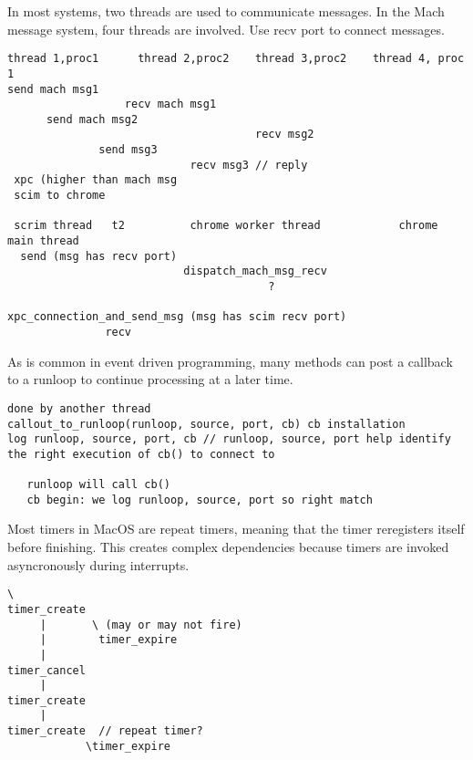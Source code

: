 In most systems, two threads are used to communicate messages.
In the Mach message system, four threads are involved.
Use recv port to connect messages.

{\footnotesize \begin{verbatim}
thread 1,proc1      thread 2,proc2    thread 3,proc2    thread 4, proc 1
send mach msg1
                  recv mach msg1
      send mach msg2
                                      recv msg2
              send msg3
                            recv msg3 // reply
 xpc (higher than mach msg
 scim to chrome

 scrim thread   t2          chrome worker thread            chrome main thread
  send (msg has recv port)
                           dispatch_mach_msg_recv
                                        ?

xpc_connection_and_send_msg (msg has scim recv port)
               recv
\end{verbatim}
}

As is common in event driven programming, many methods can post a callback to a runloop to continue processing at a later time.

{\footnotesize \begin{verbatim}
done by another thread
callout_to_runloop(runloop, source, port, cb) cb installation
log runloop, source, port, cb // runloop, source, port help identify
the right execution of cb() to connect to

   runloop will call cb()
   cb begin: we log runloop, source, port so right match
\end{verbatim}
}

Most timers in MacOS are repeat timers, meaning that the timer reregisters itself before finishing.
This creates complex dependencies because timers are invoked asyncronously during interrupts.


{\footnotesize \begin{verbatim}
\
timer_create
     |       \ (may or may not fire)
     |        timer_expire
     |
timer_cancel
     |
timer_create
     |
timer_create  // repeat timer?
            \timer_expire

\end{verbatim}
}
